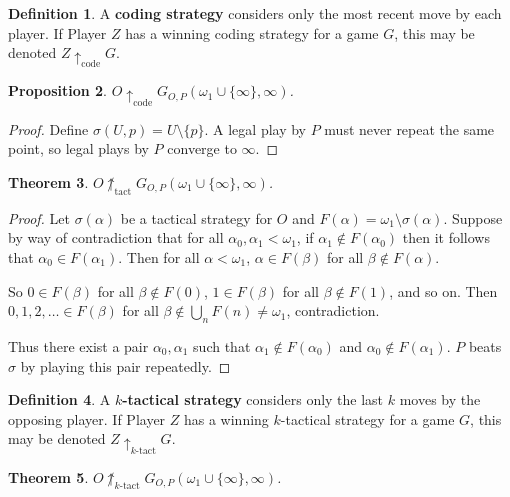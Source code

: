 \documentclass[11pt]{article}
\theoremstyle{plain}
\newtheorem{theorem}{Theorem}
\newtheorem{proposition}[theorem]{Proposition}
\theoremstyle{definition}
\newtheorem{definition}[theorem]{Definition}
\theoremstyle{remark}
\newcommand{\tactwin}{\uparrow_{\text{tact}}}
\newcommand{\ktactwin}[1]{\uparrow_{#1\text{-tact}}}
\newcommand{\codewin}{\uparrow_{\text{code}}}
\begin{document}
\begin{definition}
A \textbf{coding strategy} considers only the most recent move by each player. If Player $Z$ has a winning coding strategy for a game $G$, this may be denoted $Z \codewin G$.
\end{definition}

\begin{proposition}
$O\codewin G_{O,P}(\omega_1\cup\{\infty\},\infty)$. 
\end{proposition}

\begin{proof}
Define $\sigma(U,p)=U\setminus\{p\}$. A legal play by $P$ must never repeat the same point, so legal plays by $P$ converge to $\infty$.
\end{proof}

\begin{theorem}
$O\not\tactwin G_{O,P}(\omega_1\cup\{\infty\},\infty)$.
\end{theorem}

\begin{proof}
Let $\sigma(\alpha)$ be a tactical strategy for $O$ and $F(\alpha)=\omega_1\setminus\sigma(\alpha)$. Suppose by way of contradiction that for all $\alpha_0,\alpha_1<\omega_1$, if $\alpha_1 \not\in F(\alpha_0)$ then it follows that $\alpha_0\in F(\alpha_1)$. Then for all $\alpha<\omega_1$, $\alpha\in F(\beta)$ for all $\beta\not\in F(\alpha)$.

So $0\in F(\beta)$ for all $\beta\not\in F(0)$, $1\in F(\beta)$ for all $\beta \not\in F(1)$, and so on. Then $0,1,2,\dots\in F(\beta)$ for all $\beta\not\in\bigcup_n F(n)\not=\omega_1$, contradiction.

Thus there exist a pair $\alpha_0,\alpha_1$ such that $\alpha_1\not\in F(\alpha_0)$ and $\alpha_0\not\in F(\alpha_1)$. $P$ beats $\sigma$ by playing this pair repeatedly.
\end{proof}

\begin{definition}
A \textbf{$k$-tactical strategy} considers only the last $k$ moves by the opposing player. If Player $Z$ has a winning $k$-tactical strategy for a game $G$, this may be denoted $Z \ktactwin{k} G$.
\end{definition}

\begin{theorem}
$O\not\ktactwin{k}G_{O,P}(\omega_1\cup\{\infty\},\infty)$.
\end{theorem}
\end{document}
